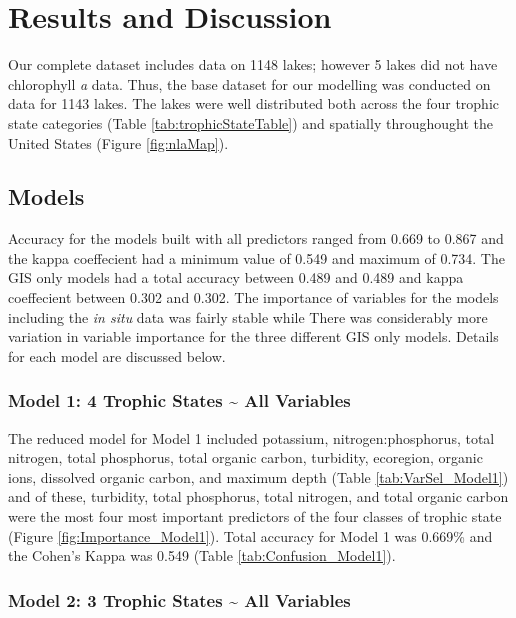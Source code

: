 \documentclass[11pt,]{article}
\begin{document}
\section{Results and Discussion}\label{results-and-discussion}

Our complete dataset includes data on 1148 lakes; however 5 lakes did
not have chlorophyll \emph{a} data. Thus, the base dataset for our
modelling was conducted on data for 1143 lakes. The lakes were well
distributed both across the four trophic state categories (Table
\ref{tab:trophicStateTable}) and spatially throughought the United
States (Figure \ref{fig:nlaMap}).

\subsection{Models}\label{models}

Accuracy for the models built with all predictors ranged from 0.669 to
0.867 and the kappa coeffecient had a minimum value of 0.549 and maximum
of 0.734. The GIS only models had a total accuracy between 0.489 and
0.489 and kappa coeffecient between 0.302 and 0.302. The importance of
variables for the models including the \emph{in situ} data was fairly
stable while There was considerably more variation in variable
importance for the three different GIS only models. Details for each
model are discussed below.

\subsubsection{Model 1: 4 Trophic States \textasciitilde{} All
Variables}\label{model-1-4-trophic-states-all-variables}

The reduced model for Model 1 included potassium, nitrogen:phosphorus,
total nitrogen, total phosphorus, total organic carbon, turbidity,
ecoregion, organic ions, dissolved organic carbon, and maximum depth
(Table \ref{tab:VarSel_Model1}) and of these, turbidity, total
phosphorus, total nitrogen, and total organic carbon were the most four
most important predictors of the four classes of trophic state (Figure
\ref{fig:Importance_Model1}). Total accuracy for Model 1 was 0.669\% and
the Cohen's Kappa was 0.549 (Table \ref{tab:Confusion_Model1}).

\subsubsection{Model 2: 3 Trophic States \textasciitilde{} All
Variables}\label{model-2-3-trophic-states-all-variables}
\end{document}

